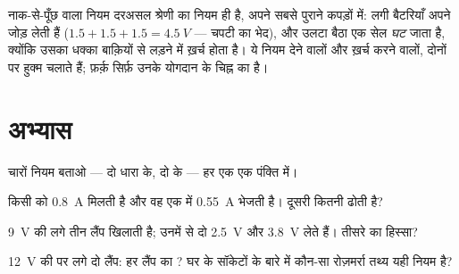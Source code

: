 \begin{remark}[बैटरियाँ भी इन्हीं नियमों के अधीन]\label{rem:g8:circuit-laws:batteries}
नाक-से-पूँछ वाला नियम दरअसल श्रेणी का  नियम ही है, अपने सबसे
पुराने कपड़ों में:  लगी बैटरियाँ अपने  जोड़ लेती हैं
($1.5 + 1.5 + 1.5 = \qty{4.5}{V}$ --- चपटी  का भेद), और उलटा बैठा
एक सेल \emph{घट} जाता है, क्योंकि उसका धक्का बाक़ियों से लड़ने में
ख़र्च होता है। ये नियम देने वालों और ख़र्च करने वालों, दोनों पर हुक्म
चलाते हैं; फ़र्क़ सिर्फ़ उनके योगदान के चिह्न का है।
\end{remark}

\section{अभ्यास}

\begin{exercise}[$\star$]\label{exo:g8:circuit-laws:1}
चारों नियम बताओ --- दो धारा के, दो  के --- हर एक एक पंक्ति
में।
\end{exercise}

\begin{exercise}[$\star$]\label{exo:g8:circuit-laws:2}
किसी  को \qty{0.8}{A} मिलती है और वह एक  में \qty{0.55}{A}
भेजती है। दूसरी  कितनी ढोती है?
\end{exercise}

\begin{exercise}[$\star$]\label{exo:g8:circuit-laws:3}
\qty{9}{V} की   लगे तीन लैंप खिलाती है; उनमें से दो
\qty{2.5}{V} और \qty{3.8}{V} लेते हैं। तीसरे का हिस्सा?
\end{exercise}

\begin{exercise}[$\star$]\label{exo:g8:circuit-laws:4}
\qty{12}{V} की  पर  लगे दो लैंप: हर लैंप का ?
घर के सॉकेटों के बारे में कौन-सा रोज़मर्रा तथ्य यही नियम है?
\end{exercise}

